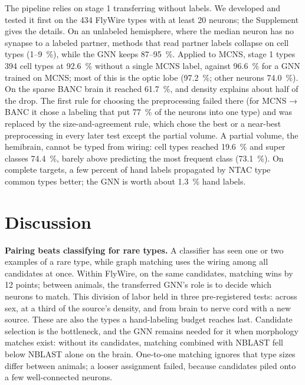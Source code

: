 \documentclass[11pt,a4paper]{article}
\begin{document}
The pipeline relies on stage 1 transferring without labels. We developed and tested it first on the 434 FlyWire types with at least 20 neurons; the Supplement gives the details. On an unlabeled hemisphere, where the median neuron has no synapse to a labeled partner, methods that read partner labels collapse on cell types (1–9~\%), while the GNN keeps 87–95~\%. Applied to MCNS, stage 1 types 394 cell types at 92.6~\% without a single MCNS label, against 96.6~\% for a GNN trained on MCNS; most of this is the optic lobe (97.2~\%; other neurons 74.0~\%). On the sparse BANC brain it reached 61.7~\%, and density explains about half of the drop. The first rule for choosing the preprocessing failed there (for MCNS → BANC it chose a labeling that put 77~\% of the neurons into one type) and was replaced by the size-and-agreement rule, which chose the best or a near-best preprocessing in every later test except the partial volume. A partial volume, the hemibrain, cannot be typed from wiring: cell types reached 19.6~\% and super classes 74.4~\%, barely above predicting the most frequent class (73.1~\%). On complete targets, a few percent of hand labels propagated by NTAC type common types better; the GNN is worth about 1.3~\% hand labels.

\section{Discussion}

\textbf{Pairing beats classifying for rare types.} A classifier has seen one or two examples of a rare type, while graph matching uses the wiring among all candidates at once. Within FlyWire, on the same candidates, matching wins by 12 points; between animals, the transferred GNN's role is to decide which neurons to match. This division of labor held in three pre-registered tests: across sex, at a third of the source's density, and from brain to nerve cord with a new source. These are also the types a hand-labeling budget reaches last. Candidate selection is the bottleneck, and the GNN remains needed for it when morphology matches exist: without its candidates, matching combined with NBLAST fell below NBLAST alone on the brain. One-to-one matching ignores that type sizes differ between animals; a looser assignment failed, because candidates piled onto a few well-connected neurons.
\end{document}
